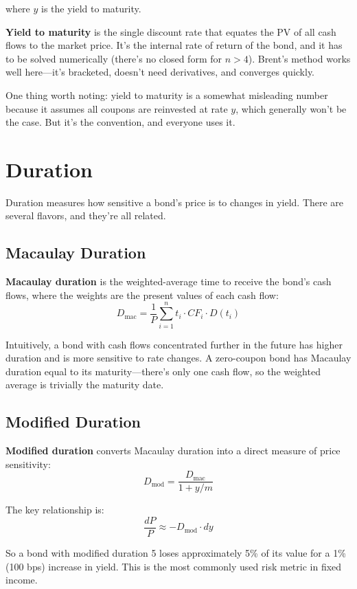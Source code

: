 \documentclass[11pt]{article}
\begin{document}
where $y$ is the yield to maturity.

\textbf{Yield to maturity} is the single discount rate that equates the PV of all cash flows to the market price. It's the internal rate of return of the bond, and it has to be solved numerically (there's no closed form for $n > 4$). Brent's method works well here---it's bracketed, doesn't need derivatives, and converges quickly.

One thing worth noting: yield to maturity is a somewhat misleading number because it assumes all coupons are reinvested at rate $y$, which generally won't be the case. But it's the convention, and everyone uses it.

\section{Duration}

Duration measures how sensitive a bond's price is to changes in yield. There are several flavors, and they're all related.

\subsection{Macaulay Duration}

\textbf{Macaulay duration} is the weighted-average time to receive the bond's cash flows, where the weights are the present values of each cash flow:
\[
D_{\text{mac}} = \frac{1}{P} \sum_{i=1}^{n} t_i \cdot CF_i \cdot D(t_i)
\]

Intuitively, a bond with cash flows concentrated further in the future has higher duration and is more sensitive to rate changes. A zero-coupon bond has Macaulay duration equal to its maturity---there's only one cash flow, so the weighted average is trivially the maturity date.

\subsection{Modified Duration}

\textbf{Modified duration} converts Macaulay duration into a direct measure of price sensitivity:
\[
D_{\text{mod}} = \frac{D_{\text{mac}}}{1 + y/m}
\]

The key relationship is:
\[
\frac{dP}{P} \approx -D_{\text{mod}} \cdot dy
\]

So a bond with modified duration 5 loses approximately 5\% of its value for a 1\% (100 bps) increase in yield. This is the most commonly used risk metric in fixed income.
\end{document}
